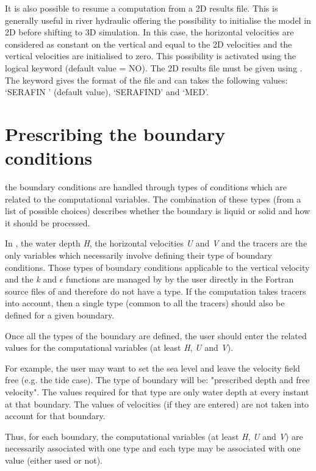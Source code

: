 It is also possible to resume a computation from a 2D results file. This is
generally useful in river hydraulic offering the possibility to initialise the
model in 2D before shifting to 3D simulation. In this case, the horizontal
velocities are considered as constant on the vertical and equal to the 2D
velocities and the vertical velocities are initialised to zero. This
possibility is activated using the  logical keyword
(default value = NO). The 2D results file must be given using . The keyword  gives
the format of the file and can takes the following values: `SERAFIN ' (default
value), `SERAFIND' and `MED'.


\section{Prescribing the boundary conditions}

the boundary conditions are handled through types of conditions which are
related to the computational variables. The combination of these types (from a
list of possible choices) describes whether the boundary is liquid or solid and
how it should be processed.

In , the water depth \textit{H}, the horizontal velocities \textit{U}
and \textit{V} and the tracers are the only variables which necessarily involve
defining their type of boundary conditions. Those types of boundary conditions
applicable to the vertical velocity and the \textit{k} and $\epsilon$ functions
are managed by  by the user directly in the Fortran source files of
 and therefore do not have a type. If the computation takes tracers
into account, then a single type (common to all the tracers) should also be
defined for a given boundary.

Once all the types of the boundary are defined, the user should enter the
related values for the computational variables (at least \textit{H}, \textit{U}
and \textit{V}).

For example, the user may want to set the sea level and leave the velocity
field free (e.g. the tide case). The type of boundary will be: "prescribed
depth and free velocity". The values required for that type are only water
depth at every instant at that boundary. The values of velocities (if they are
entered) are not taken into account for that boundary.

Thus, for each  boundary, the computational variables (at least
\textit{H}, \textit{U} and \textit{V}) are necessarily associated with one type
and each type may be associated with one value (either used or not).

